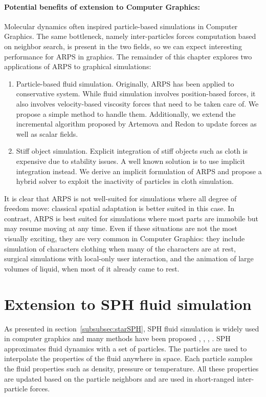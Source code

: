 \paragraph*{Potential benefits of extension to Computer Graphics:}
Molecular dynamics often inspired particle-based simulations in Computer Graphics. The same bottleneck, namely inter-particles forces computation based on neighbor search, is present in the two fields, so we can expect interesting performance for ARPS in graphics. The remainder of this chapter explores two applications of ARPS to graphical simulations:
\begin{enumerate}
\item Particle-based fluid simulation. Originally, ARPS has been applied to conservative system. While fluid simulation involves position-based forces, it also involves velocity-based viscosity forces that need to be taken care of. We propose a simple method to handle them. Additionally, we extend the incremental algorithm proposed by Artemova and Redon to update forces as well as scalar fields.
\item Stiff object simulation. Explicit integration of stiff objects such as cloth is expensive due to stability issues. A well known solution is to use implicit integration instead. We derive an implicit formulation of ARPS and propose a hybrid solver to exploit the inactivity of particles in cloth simulation.
\end{enumerate}
It is clear that ARPS is not well-suited for simulations where all degree of freedom move: classical spatial adaptation is better suited in this case. In contrast, ARPS is best suited for simulations where most parts are immobile but may resume moving at any time. Even if these situations are not the most visually exciting, they are very common in Computer Graphics: they include simulation of characters clothing when many of the characters are at rest, surgical simulations with local-only user interaction, and the animation of large volumes of liquid, when most of it already came to rest.

\section{ Extension to SPH fluid simulation } 
\label{sec:arps_sph}
As presented in section~\ref{subsubsec:starSPH}, SPH fluid simulation is widely used in computer graphics and many methods have been proposed \cite{Desbrun1996}, \cite{Muller2003}, \cite{Solenthaler2009}, \cite{Ihmsen2014:IISPH}.
SPH approximates fluid dynamics with a set of particles.
The particles are used to interpolate the properties of the fluid anywhere in space.
Each particle samples the fluid properties such as density, pressure or temperature. All these properties are updated based on the particle neighbors and are
used in short-ranged inter-particle forces.
